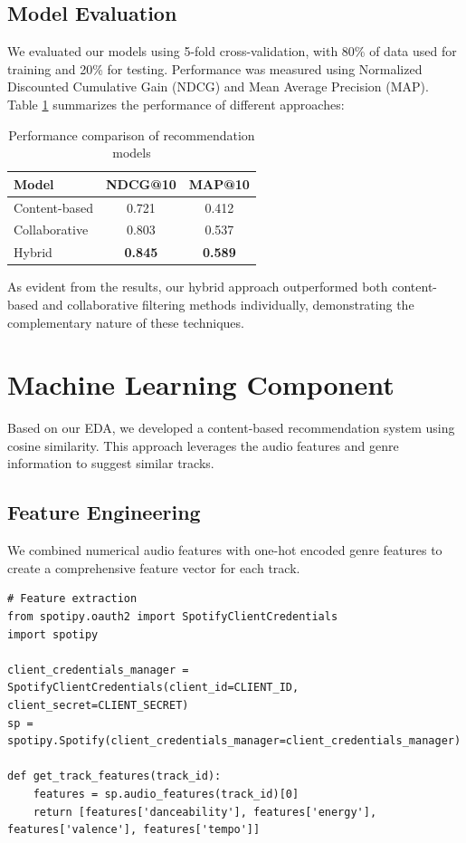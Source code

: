 \documentclass[runningheads]{llncs}
\begin{document}
\subsection{Model Evaluation}

We evaluated our models using 5-fold cross-validation, with 80\% of data used for training and 20\% for testing. Performance was measured using Normalized Discounted Cumulative Gain (NDCG) and Mean Average Precision (MAP). Table \ref{tab:model_performance} summarizes the performance of different approaches:

\begin{table}
\centering
\begin{tabular}{lcc}
\hline
Model & NDCG@10 & MAP@10 \\
\hline
Content-based & 0.721 & 0.412 \\
Collaborative & 0.803 & 0.537 \\
Hybrid & \textbf{0.845} & \textbf{0.589} \\
\hline
\end{tabular}
\caption{Performance comparison of recommendation models}
\label{tab:model_performance}
\end{table}

As evident from the results, our hybrid approach outperformed both content-based and collaborative filtering methods individually, demonstrating the complementary nature of these techniques.

\section{Machine Learning Component}

Based on our EDA, we developed a content-based recommendation system using cosine similarity. This approach leverages the audio features and genre information to suggest similar tracks.

\subsection{Feature Engineering}

We combined numerical audio features with one-hot encoded genre features to create a comprehensive feature vector for each track.

\begin{verbatim}
# Feature extraction
from spotipy.oauth2 import SpotifyClientCredentials
import spotipy

client_credentials_manager = SpotifyClientCredentials(client_id=CLIENT_ID, client_secret=CLIENT_SECRET)
sp = spotipy.Spotify(client_credentials_manager=client_credentials_manager)

def get_track_features(track_id):
    features = sp.audio_features(track_id)[0]
    return [features['danceability'], features['energy'], features['valence'], features['tempo']]
\end{verbatim}
\end{document}
